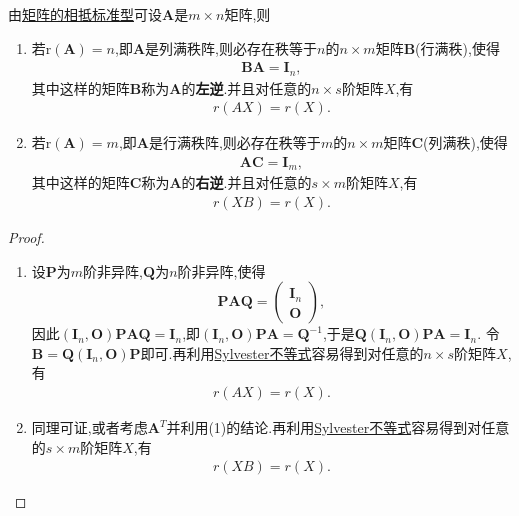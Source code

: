 \documentclass[../../main.tex]{subfiles}%
\begin{document}
\begin{proposition}[行/列满秩矩阵性质]\label{proposition:行/列满秩矩阵性质}
由\hyperref[theorem:相抵标准型]{矩阵的相抵标准型}可设\(\boldsymbol{A}\)是\(m\times n\)矩阵,则
\begin{enumerate}[(1)]
\item 若\(\mathrm{r}(\boldsymbol{A}) = n\),即\(\boldsymbol{A}\)是列满秩阵,则必存在秩等于\(n\)的\(n\times m\)矩阵\(\boldsymbol{B}\)(行满秩),使得
\begin{align*}
\boldsymbol{B}\boldsymbol{A}=\boldsymbol{I}_n,
\end{align*}
其中这样的矩阵\(\boldsymbol{B}\)称为\(\boldsymbol{A}\)的\textbf{左逆}.并且对任意的$n\times s$阶矩阵$X$,有
\begin{align*}
r(AX)=r(X).
\end{align*}

\item 若\(\mathrm{r}(\boldsymbol{A}) = m\),即\(\boldsymbol{A}\)是行满秩阵,则必存在秩等于\(m\)的\(n\times m\)矩阵\(\boldsymbol{C}\)(列满秩),使得
\begin{align*}
\boldsymbol{A}\boldsymbol{C}=\boldsymbol{I}_m,
\end{align*}
其中这样的矩阵\(\boldsymbol{C}\)称为\(\boldsymbol{A}\)的\textbf{右逆}.并且对任意的$s\times m$阶矩阵$X$,有
\begin{align*}
r(XB)=r(X).
\end{align*}
\end{enumerate}
\end{proposition}
\begin{proof}
\begin{enumerate}[(1)]
\item 设\(\boldsymbol{P}\)为\(m\)阶非异阵,\(\boldsymbol{Q}\)为\(n\)阶非异阵,使得
\[
\boldsymbol{P}\boldsymbol{A}\boldsymbol{Q}=\begin{pmatrix}
\boldsymbol{I}_n\\
\boldsymbol{O}
\end{pmatrix},
\]
因此\((\boldsymbol{I}_n,\boldsymbol{O})\boldsymbol{P}\boldsymbol{A}\boldsymbol{Q}=\boldsymbol{I}_n\),即\((\boldsymbol{I}_n,\boldsymbol{O})\boldsymbol{P}\boldsymbol{A}=\boldsymbol{Q}^{-1}\),于是\(\boldsymbol{Q}(\boldsymbol{I}_n,\boldsymbol{O})\boldsymbol{P}\boldsymbol{A}=\boldsymbol{I}_n\). 令\(\boldsymbol{B}=\boldsymbol{Q}(\boldsymbol{I}_n,\boldsymbol{O})\boldsymbol{P}\)即可.再利用\hyperref[proposition:Sylvester(西尔维斯特)不等式]{Sylvester不等式}容易得到对任意的$n\times s$阶矩阵$X$,有
\begin{align*}
r(AX)=r(X).
\end{align*}

\item 同理可证,或者考虑\(\boldsymbol{A}^T\)并利用(1)的结论.再利用\hyperref[proposition:Sylvester(西尔维斯特)不等式]{Sylvester不等式}容易得到对任意的$s\times m$阶矩阵$X$,有
\begin{align*}
r(XB)=r(X).
\end{align*}
\end{enumerate}
\end{proof}
\end{document}
